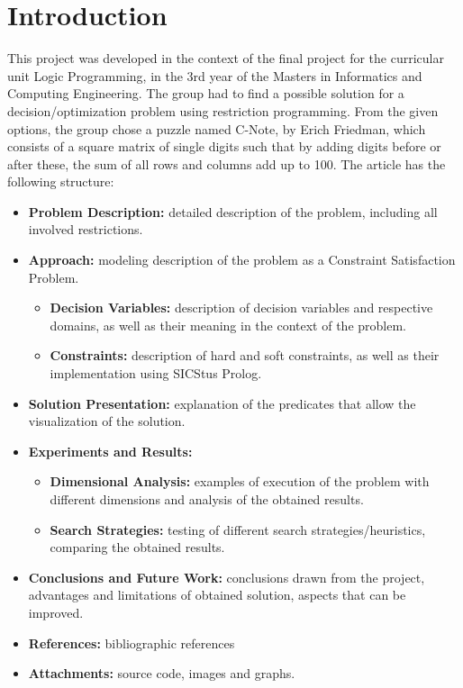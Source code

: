 \documentclass[runningheads]{llncs}
\begin{document}
\section{Introduction}
This project was developed in the context of the final project for the curricular unit Logic Programming, in the 3rd year of the Masters in Informatics and Computing Engineering. The group had to find a possible solution for a decision/optimization problem using restriction programming. From the given options, the group chose a puzzle named C-Note\cite{ref-cnote}, by Erich Friedman, which consists of a square matrix of single digits such that by adding digits before or after these, the sum of all rows and columns add up to 100.
The article has the following structure:
\begin{itemize}
    \item \textbf{Problem Description:} detailed description of the problem, including all involved restrictions.
    \item \textbf{Approach:} modeling description of the problem as a Constraint Satisfaction Problem.
    \begin{itemize}
        \item \textbf{Decision Variables:} description of decision variables and respective domains, as well as their meaning in the context of the problem.
        \item \textbf{Constraints:} description of hard and soft constraints, as well as their implementation using SICStus Prolog.
    \end{itemize}
    \item \textbf{Solution Presentation:} explanation of the predicates that allow the visualization of the solution.
    \item \textbf{Experiments and Results:}
    \begin{itemize}
        \item \textbf{Dimensional Analysis:} examples of execution of the problem with different dimensions and analysis of the obtained results.
        \item \textbf{Search Strategies:} testing of different search strategies/heuristics, comparing the obtained results. 
    \end{itemize}
    \item \textbf{Conclusions and Future Work:} conclusions drawn from the project, advantages and limitations of obtained solution, aspects that can be improved.
    \item \textbf{References:} bibliographic references
    \item \textbf{Attachments: } source code, images and graphs.
\end{itemize}
\end{document}
